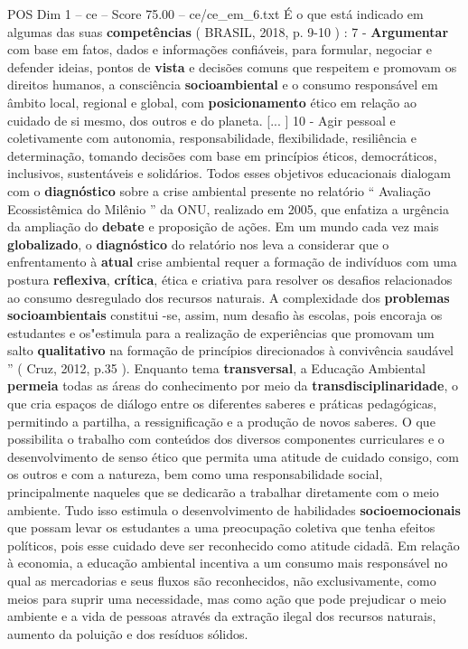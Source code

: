 \begin{textsample}{POS Dim 1 – ce – Score 75.00 – ce/ce\_em\_6.txt}
É o que está indicado em algumas das suas \textbf{competências} ( BRASIL, 2018, p. 9-10 ) : 7 - \textbf{Argumentar} com base em fatos, dados e informações confiáveis, para formular, negociar e defender ideias, pontos de \textbf{vista} e decisões comuns que respeitem e promovam os direitos humanos, a consciência \textbf{socioambiental} e o consumo responsável em âmbito local, regional e global, com \textbf{posicionamento} ético em relação ao cuidado de si mesmo, dos outros e do planeta. [... ] 10 - Agir pessoal e coletivamente com autonomia, responsabilidade, flexibilidade, resiliência e determinação, tomando decisões com base em princípios éticos, democráticos, inclusivos, sustentáveis e solidários.
Todos esses objetivos educacionais dialogam com o \textbf{diagnóstico} sobre a crise ambiental presente no relatório “ Avaliação Ecossistêmica do Milênio ” da ONU, realizado em 2005, que enfatiza a urgência da ampliação do \textbf{debate} e proposição de ações.
Em um mundo cada vez mais \textbf{globalizado}, o \textbf{diagnóstico} do relatório nos leva a considerar que o enfrentamento à \textbf{atual} crise ambiental requer a formação de indivíduos com uma postura \textbf{reflexiva}, \textbf{crítica}, ética e criativa para resolver os desafios relacionados ao consumo desregulado dos recursos naturais.
A complexidade dos \textbf{problemas} \textbf{socioambientais} constitui -se, assim, num desafio às escolas, pois encoraja os estudantes e os"estimula para a realização de experiências que promovam um salto \textbf{qualitativo} na formação de princípios direcionados à convivência saudável ” ( Cruz, 2012, p.35 ).
Enquanto tema \textbf{transversal}, a Educação Ambiental \textbf{permeia} todas as áreas do conhecimento por meio da \textbf{transdisciplinaridade}, o que cria espaços de diálogo entre os diferentes saberes e práticas pedagógicas, permitindo a partilha, a ressignificação e a produção de novos saberes.
O que possibilita o trabalho com conteúdos dos diversos componentes curriculares e o desenvolvimento de senso ético que permita uma atitude de cuidado consigo, com os outros e com a natureza, bem como uma responsabilidade social, principalmente naqueles que se dedicarão a trabalhar diretamente com o meio ambiente.
Tudo isso estimula o desenvolvimento de habilidades \textbf{socioemocionais} que possam levar os estudantes a uma preocupação coletiva que tenha efeitos políticos, pois esse cuidado deve ser reconhecido como atitude cidadã.
Em relação à economia, a educação ambiental incentiva a um consumo mais responsável no qual as mercadorias e seus fluxos são reconhecidos, não exclusivamente, como meios para suprir uma necessidade, mas como ação que pode prejudicar o meio ambiente e a vida de pessoas através da extração ilegal dos recursos naturais, aumento da poluição e dos resíduos sólidos.

\end{textsample}
